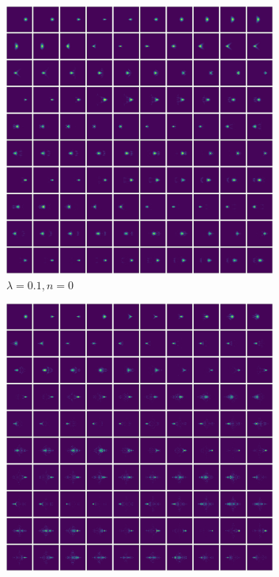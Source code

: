 \documentclass[11pt]{report}
\begin{document}
\begin{figure}[h!]
	\centering
	\begin{subfigure}[b]{0.49\textwidth}
		\centering
		\includegraphics[width=0.98\textwidth]{lam01_0.png}
		\caption{$\lambda=0.1, n=0$}
		\label{fig: < >}
	\end{subfigure}
	\hfill
	\begin{subfigure}[b]{0.49\textwidth}
		\centering
		\includegraphics[width=0.98\textwidth]{lam05_0.png}

\end{subfigure}
\end{figure}
\end{document}
